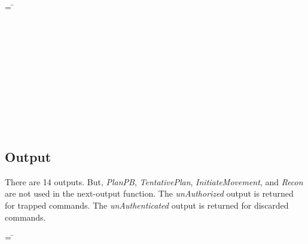 \documentclass[../../main/main.tex]{subfiles}
\begin{document}
\begin{tabbing}
\parskip=8pt
 = \= \\
				\>\HOLTokenBar{}  \\
				\>\HOLTokenBar{}  \\
				\>\HOLTokenBar{} \\
        				\>\HOLTokenBar{}  \\
				\>\HOLTokenBar{}  \\
				\>\HOLTokenBar{}  \\
				\>\HOLTokenBar{} \\
        				\>\HOLTokenBar{}  \\
				\>\HOLTokenBar{}  \\
				\>\HOLTokenBar{}  \\
				\>\HOLTokenBar{} 
\parskip=18pt
\end{tabbing}

\subsection{Output}
There are 14 outputs.  But, \textit{PlanPB}, \textit{TentativePlan}, \textit{InitiateMovement}, and \textit{Recon} are not used in the next-output function.  The \textit{unAuthorized} output is returned for trapped commands.  The \textit{unAuthenticated} output is returned for discarded commands.

\begin{tabbing}
\parskip=8pt
 =  \= \\
					\>\HOLTokenBar{}  \\
					\>\HOLTokenBar{}  \\
					\>\HOLTokenBar{} \\
         				\>\HOLTokenBar{}  \\
					\>\HOLTokenBar{}  \\
					\>\HOLTokenBar{}  \\
					\>\HOLTokenBar{} \\
         				\>\HOLTokenBar{}  \\
					\>\HOLTokenBar{}  \\
					\>\HOLTokenBar{}  \\
					\>\HOLTokenBar{} \\
         				\>\HOLTokenBar{}  \\
					\>\HOLTokenBar{} 
\parskip=18pt
\end{tabbing}
\end{document}
